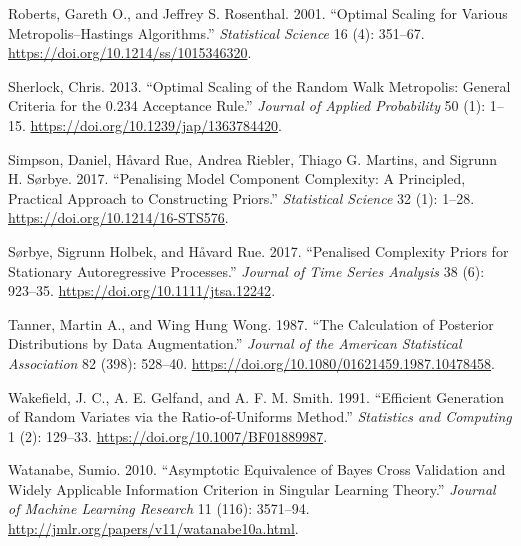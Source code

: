 \documentclass[
  11pt,
  letterpaper,
]{scrbook}
\newlength{\cslhangindent}
\newlength{\cslentryspacingunit} %
\newenvironment{CSLReferences}[2] %
 {%
  \setlength{\parindent}{0pt}
  \ifodd #1
  \let\oldpar\par
  \def\par{\hangindent=\cslhangindent\oldpar}
  \fi
  \setlength{\parskip}{#2\cslentryspacingunit}
 }%
 {}
\theoremstyle{definition}
\theoremstyle{definition}
\theoremstyle{definition}
\theoremstyle{plain}
\theoremstyle{remark}
\begin{document}
\begin{CSLReferences}{1}{0}
\leavevmode{}%
Roberts, Gareth O., and Jeffrey S. Rosenthal. 2001. {``Optimal Scaling
for Various {M}etropolis--{H}astings Algorithms.''} \emph{Statistical
Science} 16 (4): 351--67. \url{https://doi.org/10.1214/ss/1015346320}.

\leavevmode{}%
Sherlock, Chris. 2013. {``Optimal Scaling of the Random Walk
{M}etropolis: General Criteria for the 0.234 Acceptance Rule.''}
\emph{Journal of Applied Probability} 50 (1): 1--15.
\url{https://doi.org/10.1239/jap/1363784420}.

\leavevmode{}%
Simpson, Daniel, Håvard Rue, Andrea Riebler, Thiago G. Martins, and
Sigrunn H. Sørbye. 2017. {``Penalising Model Component Complexity: A
Principled, Practical Approach to Constructing Priors.''}
\emph{Statistical Science} 32 (1): 1--28.
\url{https://doi.org/10.1214/16-STS576}.

\leavevmode{}%
Sørbye, Sigrunn Holbek, and Håvard Rue. 2017. {``Penalised Complexity
Priors for Stationary Autoregressive Processes.''} \emph{Journal of Time
Series Analysis} 38 (6): 923--35.
\url{https://doi.org/10.1111/jtsa.12242}.

\leavevmode{}%
Tanner, Martin A., and Wing Hung Wong. 1987. {``The Calculation of
Posterior Distributions by Data Augmentation.''} \emph{Journal of the
American Statistical Association} 82 (398): 528--40.
\url{https://doi.org/10.1080/01621459.1987.10478458}.

\leavevmode{}%
Wakefield, J. C., A. E. Gelfand, and A. F. M. Smith. 1991. {``Efficient
Generation of Random Variates via the Ratio-of-Uniforms Method.''}
\emph{Statistics and Computing} 1 (2): 129--33.
\url{https://doi.org/10.1007/BF01889987}.

\leavevmode{}%
Watanabe, Sumio. 2010. {``Asymptotic Equivalence of {B}ayes Cross
Validation and Widely Applicable Information Criterion in Singular
Learning Theory.''} \emph{Journal of Machine Learning Research} 11
(116): 3571--94. \url{http://jmlr.org/papers/v11/watanabe10a.html}.

\end{CSLReferences}


\backmatter
\end{document}
